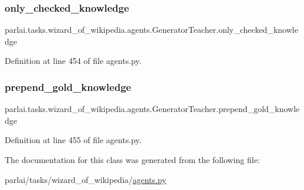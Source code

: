 \subsubsection{\texorpdfstring{only\+\_\+checked\+\_\+knowledge}{only\_checked\_knowledge}}
{\footnotesize\ttfamily parlai.\+tasks.\+wizard\+\_\+of\+\_\+wikipedia.\+agents.\+Generator\+Teacher.\+only\+\_\+checked\+\_\+knowledge}



Definition at line 454 of file agents.\+py.

\mbox{\label{classparlai_1_1tasks_1_1wizard__of__wikipedia_1_1agents_1_1GeneratorTeacher_a83ff7bb3c705386f3b4e9ae07c0d04fe}} 
\subsubsection{\texorpdfstring{prepend\+\_\+gold\+\_\+knowledge}{prepend\_gold\_knowledge}}
{\footnotesize\ttfamily parlai.\+tasks.\+wizard\+\_\+of\+\_\+wikipedia.\+agents.\+Generator\+Teacher.\+prepend\+\_\+gold\+\_\+knowledge}



Definition at line 455 of file agents.\+py.



The documentation for this class was generated from the following file\+:\begin{DoxyCompactItemize}
\item 
parlai/tasks/wizard\+\_\+of\+\_\+wikipedia/\hyperlink{parlai_2tasks_2wizard__of__wikipedia_2agents_8py}{agents.\+py}\end{DoxyCompactItemize}
